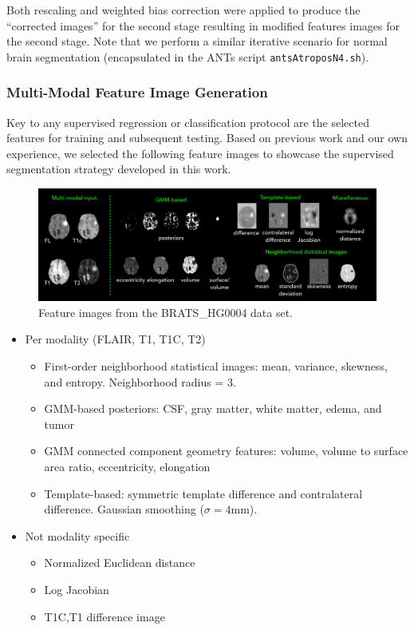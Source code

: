 \documentclass[final,5p,times,twocolumn]{elsarticle}
\begin{document}
Both rescaling and weighted bias correction were applied to produce
the ``corrected images'' for the second stage resulting in
modified features images for the second stage.  Note that we
perform a similar iterative scenario for normal brain 
segmentation \cite{avants2011} (encapsulated in the ANTs script 
\verb#antsAtroposN4.sh#).

\subsubsection{Multi-Modal Feature Image Generation}

Key to any supervised regression or classification protocol are the 
selected features for training and subsequent testing.  Based on previous
work and our own experience, we selected the following feature images
to showcase the supervised segmentation strategy developed in this work.

\begin{figure}
  \centering
  \includegraphics[width=180mm]{Figures/featuresImages.pdf}
  \caption{Feature images from the BRATS\_HG0004 data set.}
\end{figure}

\begin{itemize}
  \item Per modality (FLAIR, T1, T1C, T2)
    \begin{itemize}
      \item First-order neighborhood statistical images:
            mean, variance, skewness, and entropy. 
            Neighborhood radius = 3.
    \item GMM-based posteriors: CSF, gray matter, white matter, edema, and tumor
    \item GMM connected component geometry features:  volume, volume to 
          surface area ratio, eccentricity, elongation
    \item Template-based:  symmetric template difference and contralateral difference.
          Gaussian smoothing ($\sigma = 4$mm).
    \end{itemize}
  \item Not modality specific
    \begin{itemize}
    \item Normalized Euclidean distance
    \item Log Jacobian  
    \item T1C,T1 difference image
    \end{itemize}
\end{itemize}
\end{document}
